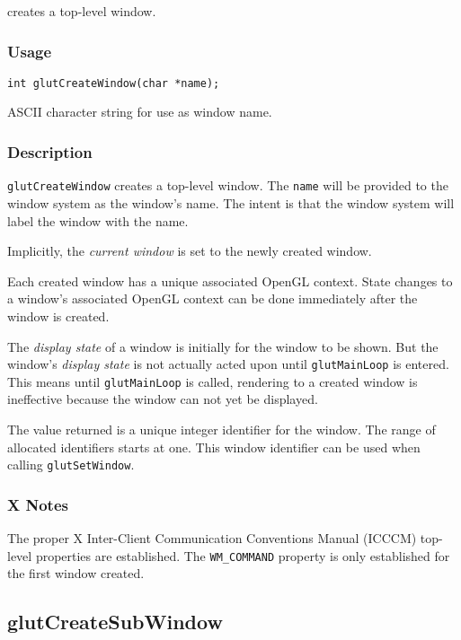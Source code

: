  creates a top-level window.

\subsubsection*{Usage}
\begin{verbatim}
int glutCreateWindow(char *name);
\end{verbatim}
\begin{description}
\itemsep 0in
\item[\tt name]
ASCII character string for use as window name.
\end{description}

\subsubsection*{Description}
{\tt glutCreateWindow} creates a top-level window.  The {\tt name} will
be provided to the window system as the window's name.  The intent is that the
window system will label the window with the name.

Implicitly, the {\em current window} is set to the newly created window.

Each created window has a unique associated OpenGL context.  State changes to
a window's associated OpenGL context can be done immediately after the
window is created.

The {\em display state} of a window is initially for the window
to be shown.  But the window's {\em display state} is not actually
acted upon until {\tt glutMainLoop} is entered.  This means until {\tt glutMainLoop}
is called, rendering to a created window is ineffective because the window
can not yet be displayed.

The value returned is a unique integer identifier for the window.  The
range of allocated identifiers starts at one.  This window identifier
can be used when calling {\tt glutSetWindow}.

\subsubsection*{X Notes}

The proper X Inter-Client Communication Conventions Manual
(ICCCM)
top-level properties are established.
The {\tt WM\_COMMAND} property is only established for the first window created.

\subsection{glutCreateSubWindow}

